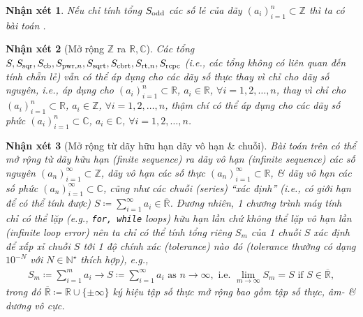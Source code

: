 \documentclass{article}
\newtheorem{nhanxet}{Nhận xét}
\begin{document}
\begin{nhanxet}
	Nếu chỉ tính tổng $S_{\rm odd}$ các số lẻ của dãy $(a_i)_{i=1}^n\subset\mathbb{Z}$ thì ta có bài toán \emph{\cite[3., p. 25, Tây Ninh 2019]{VietSTEM2021}}.
\end{nhanxet}

\begin{nhanxet}[Mở rộng $\mathbb{Z}$ ra $\mathbb{R},\mathbb{C}$]
	Các tổng $S,S_{\rm sqr},S_{\rm cb},S_{{\rm pwr},n},S_{\rm sqrt},S_{\rm cbrt},S_{{\rm rt},n},S_{\rm rcpc}$ (i.e., các tổng không có liên quan đến tính chẵn lẻ) vẫn có thể áp dụng cho các dãy số thực thay vì chỉ cho dãy số nguyên, i.e., áp dụng cho $(a_i)_{i=1}^n\subset\mathbb{R}$, $a_i\in\mathbb{R}$, $\forall i = 1,2,\ldots,n$, thay vì chỉ cho $(a_i)_{i=1}^n\subset\mathbb{R}$, $a_i\in\mathbb{Z}$, $\forall i = 1,2,\ldots,n$, thậm chí có thể áp dụng cho các dãy số phức $(a_i)_{i=1}^n\subset\mathbb{C}$, $a_i\in\mathbb{C}$, $\forall i = 1,2,\ldots,n$.
\end{nhanxet}

\begin{nhanxet}[Mở rộng từ dãy hữu hạn dãy vô hạn \& chuỗi]
	Bài toán trên có thể mở rộng từ dãy hữu hạn (finite sequence) ra dãy vô hạn (infinite sequence) các số nguyên $(a_n)_{i=1}^\infty\subset\mathbb{Z}$, dãy vô hạn các số thực $(a_n)_{i=1}^\infty\subset\mathbb{R}$, \& dãy vô hạn các số phức $(a_n)_{i=1}^\infty\subset\mathbb{C}$, cũng như các chuỗi (series) ``xác định'' (i.e., có giới hạn để có thể tính được) $S\coloneqq\sum_{i=1}^\infty a_i\in\overline{\mathbb{R}}$. Đương nhiên, 1 chương trình máy tính chỉ có thể lặp (e.g., {\tt for, while} loops) hữu hạn lần chứ không thể lặp vô hạn lần (infinite loop error) nên ta chỉ có thể tính tổng riêng $S_m$ của 1 chuỗi $S$ xác định để xấp xỉ chuỗi $S$ tới 1 độ chính xác (tolerance) nào đó (tolerance thường có dạng $10^{-N}$ với $N\in\mathbb{N}^\star$ thích hợp), e.g.,
	\begin{align*}
		S_m\coloneqq\sum_{i=1}^m a_i\to S\coloneqq\sum_{i=1}^\infty a_i\mbox{ as } n\to\infty,\mbox{ i.e. } \lim_{m\to\infty} S_m = S\mbox{ if } S\in\overline{\mathbb{R}},
	\end{align*}
	trong đó $\overline{\mathbb{R}}\coloneqq\mathbb{R}\cup\{\pm\infty\}$ ký hiệu tập số thực mở rộng bao gồm tập số thực, âm- \& dương vô cực.
\end{nhanxet}
\end{document}
